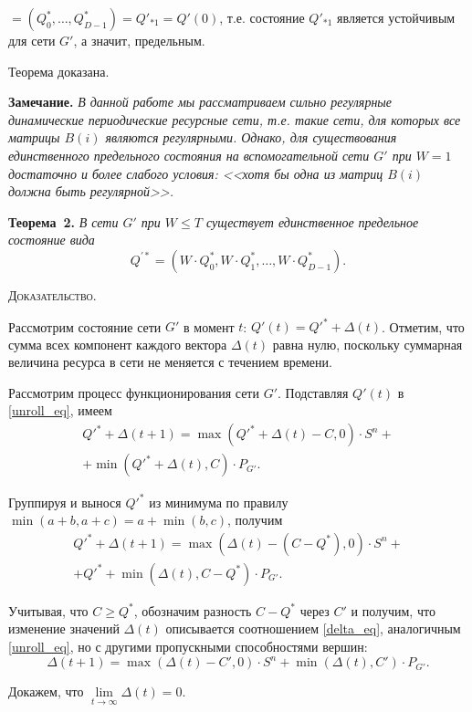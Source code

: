 \documentclass[a4paper,12pt]{article}
\begin{document}
\noindent $=\left(Q^*_0,\dots,Q^*_{D-1}\right)=Q'_{*1}=Q'(0)$, т.е. состояние $Q'_{*1}$ является устойчивым для сети $G'$, а значит, предельным.

Теорема доказана.

{\bf Замечание. }
{\it В данной работе мы рассматриваем сильно регулярные динамические периодические ресурсные сети, т.е. такие сети, для которых все матрицы $B(i)$ являются регулярными. Однако, для существования единственного предельного состояния на вспомогательной сети $G'$ при $W=1$ достаточно и более слабого условия: <<хотя бы одна из матриц $B(i)$ должна быть регулярной>>.}

{\bf Теорема~2. }{\it 
		В сети $G'$ при $W\leq T$ существует единственное предельное состояние вида $$Q^{\prime *}=\left(W\cdot Q^*_0, W\cdot Q^*_1, \dots, W \cdot Q^*_{D-1}\right).$$
}

\textsc{Доказательство. }

		Рассмотрим состояние сети $G'$ в момент $t$: $Q'(t) = Q'^* + \Delta(t)$. Отметим, что сумма всех компонент каждого вектора $\Delta(t)$ равна нулю, поскольку суммарная величина ресурса в сети не меняется с течением времени. 
		
		Рассмотрим процесс функционирования сети $G'$. Подставляя $Q'(t)$ в \eqref{unroll_eq}, имеем
	\begin{multline*}
		Q'^* + \Delta(t+1) = \max (Q'^* + \Delta(t) - C, 0)\cdot S^n +\\ + \min (Q'^* + \Delta(t), C)\cdot P_{G'}.
	\end{multline*}
		
		Группируя и вынося $Q'^*$ из минимума по правилу $\min(a + b, a + c) = a + \min(b, c)$, получим
		\begin{multline*}
		Q'^*+\Delta(t+1) = \max (\Delta(t) - (C - Q^*), 0)\cdot S^n +\\ +Q'^*+ \min (\Delta(t), C - Q^*)\cdot P_{G'}.
		\end{multline*}
		
		Учитывая, что $C \geq Q^*$, обозначим разность $C - Q^*$ через $C'$ и получим, что изменение значений $\Delta(t)$ описывается соотношением \eqref{delta_eq}, аналогичным \eqref{unroll_eq}, но с другими пропускными способностями вершин:
		\begin{equation}
			\label{delta_eq}
				\Delta(t+1) = \max (\Delta(t) - C', 0)\cdot S^n + \min (\Delta(t), C')\cdot P_{G'}.
		\end{equation}
		
		Докажем, что $\lim\limits_{t\to \infty}\Delta(t) = 0$. 
		
\end{document}
